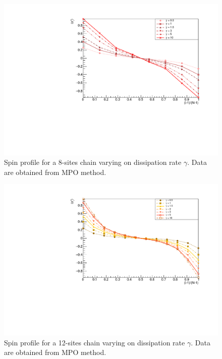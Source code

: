 \begin{figure}[H]
    \centering
    \includegraphics[scale=0.7]{Figures/8sites/8sites_LMvsGamma.pdf}
    \caption{Spin profile for a 8-sites chain varying on dissipation rate $\gamma$. Data are obtained from MPO method.}
    \label{fig:8sites_LMvsGamma}
\end{figure}

\begin{figure}[H]
    \centering
    \includegraphics[scale=0.7]{Figures/12sites/12sites_LMvsGamma.pdf}
    \caption{Spin profile for a 12-sites chain varying on dissipation rate $\gamma$. Data are obtained from MPO method.}
    \label{fig:12sites_LMvsGamma}
\end{figure}

